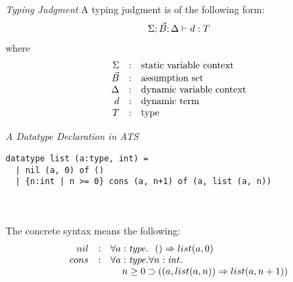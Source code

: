\documentclass[pdf]{prosper}
\begin{document}
\def\dc{{\it dc}}
\def\dcc{{\it dcc}}
\def\dcf{{\it dcf}}
\def\iforall#1{\forall^{+}(#1)}
\def\eforall#1{\forall^{-}(#1)}
\def\iguard#1{\supset^{+}\kern-2pt(#1)}
\def\eguard#1{\supset^{-}\kern-2pt(#1)}
\def\lam#1#2{\mbox{\bf lam}\;#1.#2}
\def\app#1#2{\mbox{\bf app}(#1,#2)}
\def\letin#1#2{\mbox{\bf let}\;#1\;{\bf in}\;#2}
\begin{slide}{\em Typing Judgment}
A typing judgment is of the following form:
\[\begin{array}{c}
\Sigma;\vec{B};\Delta\vdash d:T
\end{array}\]
where
\[\begin{array}{rcl}
\Sigma & : & \mbox{static variable context} \\
\vec{B} & : & \mbox{assumption set} \\
\Delta & : & \mbox{dynamic variable context} \\
d & : & \mbox{dynamic term} \\
T & : & \mbox{type} \\
\end{array}\]
\end{slide}
\begin{slide}{\em A Datatype Declaration in ATS}
{\blue\begin{verbatim}
datatype list (a:type, int) =
  | nil (a, 0) of ()
  | {n:int | n >= 0} cons (a, n+1) of (a, list (a, n))
\end{verbatim}
}~\\~\\
The concrete syntax means the following:
\[\begin{array}{rcl}
nil & : & \forall a:{\it type}.~~() \Rightarrow list (a, 0) \\
cons & : & \forall a:{\it type}.\forall n:{\it int}. \\
     &   & \kern12pt n\geq 0 \supset ((a, list (a, n)) \Rightarrow list (a, n+1)) \\
\end{array}\]
\vfill
\end{slide}
\end{document}
